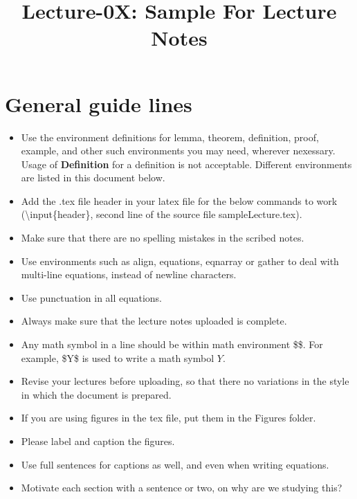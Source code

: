 \documentclass[a4paper,english,10pt]{article}
\title{Lecture-0X: Sample For Lecture Notes}
\author{}
\begin{document}
\maketitle
\section{General guide lines}
\begin{itemize}
\item Use the environment definitions for lemma, theorem, definition, proof, example, and other such environments you may need, wherever nexessary. Usage of {\bf Definition} for a definition is not acceptable. Different environments are listed in this document below.
\item Add the .tex file header in your latex file for the below commands to work (\textbackslash input\{header\}, second line of the source file sampleLecture.tex).
\item Make sure that there are no spelling mistakes in the scribed notes.
\item Use environments such as align, equations, eqnarray or gather to deal with multi-line equations, instead of newline characters. 
\item Use punctuation in all equations.
\item Always make sure that the lecture notes uploaded is complete.
\item Any math symbol in a line should be within math environment \$\$. For example, \$Y\$ is used to write a math symbol $Y$.
\item Revise your lectures before uploading, so that there no variations in the style in which the document is prepared.
\item If you are using figures in the tex file, put them in the Figures folder.
\item Please label and caption the figures.
\item Use full sentences for captions as well, and even when writing equations.
\item Motivate each section with a sentence or two, on why are we studying this?
\end{itemize}
\end{document}
